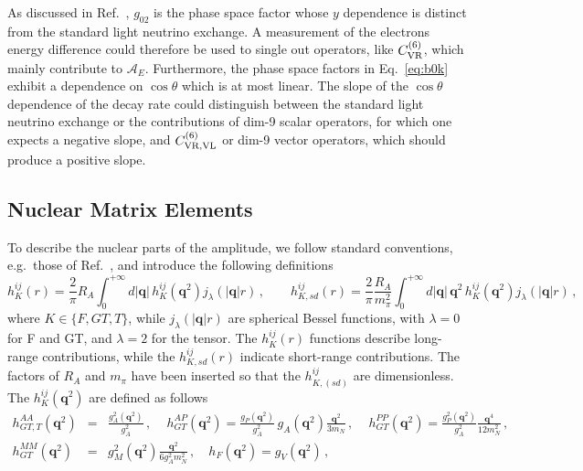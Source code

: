 \documentclass[letterpaper,11pt]{article}
\renewcommand{\vec}[1]{{\mathbf #1}}
\newcommand{\sq}{^{2}}
\begin{document}
As discussed in Ref.\ \cite{Cirigliano:2017djv}, $g_{02}$ is the phase space factor whose $y$ dependence is distinct from the standard light neutrino exchange.
A measurement of the electrons energy difference  could therefore be used to single out operators, like $C^{(6)}_{\rm VR}$, which mainly contribute to $\mathcal A_E$. Furthermore, 
the phase space factors in Eq.\ \eqref{eq:b0k} exhibit a dependence on $\cos\theta$ which is at most linear.  The slope of the $\cos\theta$ dependence of the decay rate could distinguish 
between the standard light neutrino exchange or the contributions of dim-9 scalar  operators, for which one expects a negative slope, 
and $C^{(6)}_{\rm VR, VL}$ or dim-9 vector operators, which should produce a positive slope.




\subsection{Nuclear Matrix Elements}\label{NME}
To describe the nuclear parts of the amplitude, we follow standard conventions, e.g.\ those of Ref.~\cite{Hyvarinen:2015bda}, and introduce the following definitions
\begin{equation}\label{eq:hK}
h^{ij}_K(r) = \frac{2}{\pi} R_A \int_0^{+\infty} d |\vec q|\,   h^{ij}_{K}(\vec q\sq) j_{\lambda} (|\vec q| r)\,,\qquad h^{ij}_{K,sd}(r) = \frac{2}{\pi} \frac{R_A}{m_\pi^2} \int_0^{+\infty} d |\vec q|\, \vec q\sq \,   h^{ij}_K(\vec q\sq) j_{\lambda} (|\vec q| r)\,,
\end{equation}
where $K \in \{F, GT, T\}$, while $j_{\lambda} (|\vec q| r)$ are  spherical Bessel functions, with $\lambda = 0$ for F and GT, and $\lambda =2$ for the tensor. The $h^{ij}_K(r)$ functions describe long-range contributions, while the $h^{ij}_{K,sd}(r)$ indicate short-range contributions. 
The factors of $R_A$ and $m_{\pi}$ have been inserted so that the $h^{ij}_{K, (sd)}$ are dimensionless. The $h^{ij}_K(\vec q\sq)$ are defined as follows
\begin{eqnarray}\label{smff}
h^{AA}_{GT,T}(\vec q^2) &=&  \frac{g_A^2(\vec q^2)}{g_A\sq}\,, \quad \, h_{GT}^{AP}(\vec q^2) = \frac{g_P(\vec q^2)}{g_A\sq} \, g_A(\vec q^2) \frac{\vec q^2}{3 m_N}\,,\quad  \, h_{GT}^{PP}(\vec q^2) = \frac{ g^2_P(\vec q^2)}{g_A\sq} \frac{\vec q^4}{12 m_N^2}\,, \nonumber \\
h^{MM}_{GT}(\vec q^2) &=&  g_M^2(\vec q^2) \frac{\vec q^2}{6g_A\sq m_N^2}\,,\quad h_F(\vec q\sq) = g_V(\vec q\sq)\,,
\end{eqnarray}
\end{document}
